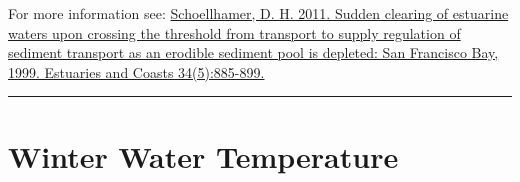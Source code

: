 \documentclass[
]{book}
\begin{document}
\begin{disclaimer}
For more information see:
\href{https://link.springer.com/article/10.1007/s12237-011-9382-x}{Schoellhamer,
D. H. 2011. Sudden clearing of estuarine waters upon crossing the
threshold from transport to supply regulation of sediment transport as
an erodible sediment pool is depleted: San Francisco Bay, 1999.
Estuaries and Coasts 34(5):885-899.}
\end{disclaimer}

\begin{center}\rule{0.5\linewidth}{0.5pt}\end{center}

\hypertarget{winter-water-temperature}{%
\section{Winter Water Temperature}\label{winter-water-temperature}}
\end{document}
